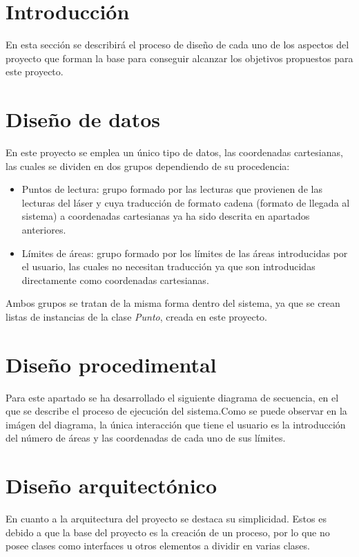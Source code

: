 
\section{Introducción}

En esta sección se describirá el proceso de diseño de cada uno de los aspectos del proyecto que forman la base para conseguir alcanzar los objetivos propuestos para este proyecto.\\

\section{Diseño de datos}

En este proyecto se emplea un único tipo de datos, las coordenadas cartesianas, las cuales se dividen en dos grupos dependiendo de su procedencia:
\begin{itemize}
	\item Puntos de lectura: grupo formado por las lecturas que provienen de las lecturas del láser y cuya traducción de formato cadena (formato de llegada al sistema) a coordenadas cartesianas ya ha sido descrita en apartados anteriores.
	\item Límites de áreas: grupo formado por los límites de las áreas introducidas por el usuario, las cuales no necesitan traducción ya que son introducidas directamente como coordenadas cartesianas.
\end{itemize}
Ambos grupos se tratan de la misma forma dentro del sistema, ya que se crean listas de instancias de la clase \textit{Punto}, creada en este proyecto.

\section{Diseño procedimental}

Para este apartado se ha desarrollado el siguiente diagrama de secuencia, en el que se describe el proceso de ejecución del sistema.Como se puede observar en la imágen del diagrama, la única interacción que tiene el usuario es la introducción del número de áreas y las coordenadas de cada uno de sus límites.

\section{Diseño arquitectónico}

En cuanto a la arquitectura del proyecto se destaca su simplicidad. Estos es debido a que la base del proyecto es la creación de un proceso, por lo que no posee clases como interfaces u otros elementos a dividir en varias clases.
